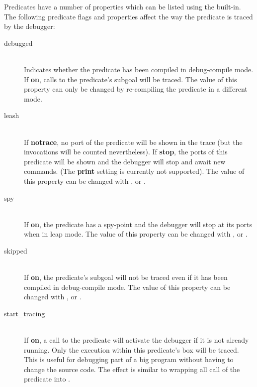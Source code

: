 Predicates have a number of properties which can be listed using the
 built-in.
The following predicate flags and properties affect the way the
predicate is traced by the debugger:
\begin{description}
\item[debugged]\ \\
        Indicates whether the predicate has been compiled in debug-compile mode.
        If {\bf on}, calls to the predicate's subgoal will be traced.
        The value of this property can only be changed by re-compiling
        the predicate in a different mode.

\item[leash]\ \\
        If {\bf notrace}, no port of the predicate will be shown
        in the trace (but the invocations will be counted nevertheless).
        If {\bf stop}, the ports of this predicate will be shown and
        the debugger will stop and await new commands.
        (The {\bf print} setting is currently not supported).
        The value of this property can be changed with
        ,
         or
        .

\item[spy]\ \\
        If {\bf on}, the predicate has a spy-point and the debugger will
        stop at its ports when in leap mode.
        The value of this property can be changed with
        ,
         or
        .
        
\item[skipped]\ \\
        If {\bf on}, the predicate's subgoal will not be traced even
        if it has been compiled in debug-compile mode.
        The value of this property can be changed with
        ,
         or
        .

\item[start_tracing]\ \\
        If {\bf on}, a call to the predicate will activate the debugger if it
        is not already running.
        Only the execution within this predicate's box will be traced.
        This is useful for debugging part of a big
        program without having to change the source code.
        The effect is similar to wrapping all call of the predicate into
        .
\end{description}


